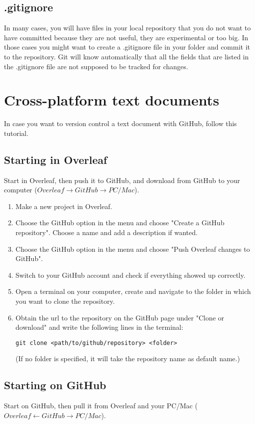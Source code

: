 \documentclass{report}
\begin{document}
\subsection{.gitignore}
In many cases, you will have files in your local repository that you do not want to have committed because they are not useful, they are experimental or too big. In those cases you might want to create a .gitignore file in your folder and commit it to the repository. Git will know automatically that all the fields that are listed in the .gitignore file are not supposed to be tracked for changes.

\section{Cross-platform text documents}
In case you want to version control a text document with GitHub, follow this tutorial.

\subsection{Starting in Overleaf}
Start in Overleaf, then push it to GitHub, and download from GitHub to your computer
($Overleaf \rightarrow GitHub \rightarrow PC/Mac$).

\begin{enumerate}[noitemsep]
    \item Make a new project in Overleaf.
    \item Choose the GitHub option in the menu and choose "Create a GitHub repository". Choose a name and add a description if wanted.
    \item Choose the GitHub option in the menu and choose "Push Overleaf changes to GitHub".
    \item Switch to your GitHub account and check if everything showed up correctly.
    \item Open a terminal on your computer, create and navigate to the folder in which you want to clone the repository.
    \item Obtain the url to the repository on the GitHub page under "Clone or download" and write the following lines in the terminal: 
    \begin{verbatim}
git clone <path/to/github/repository> <folder>
    \end{verbatim}
    (If no folder is specified, it will take the repository name as default name.)
\end{enumerate}

\subsection{Starting on GitHub}
Start on GitHub, then pull it from Overleaf and your PC/Mac
($Overleaf \leftarrow GitHub \rightarrow PC/Mac$).
\end{document}

